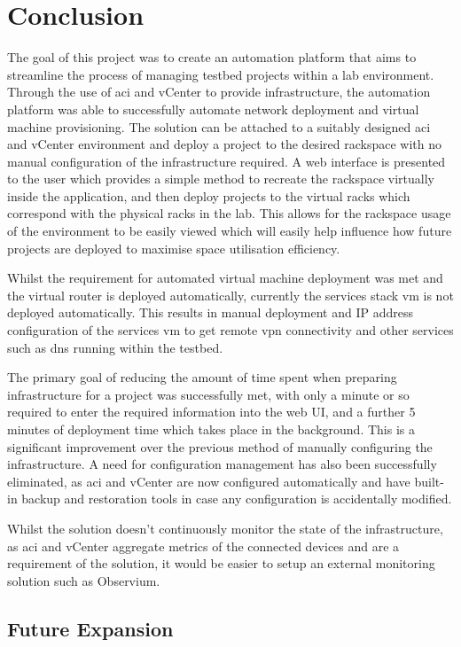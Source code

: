 \chapter{Conclusion}
\label{chap:conclusion}
The goal of this project was to create an automation platform that aims to streamline the process of managing testbed projects within a lab environment. Through the use of \gls{aci} and vCenter to provide infrastructure, the automation platform was able to successfully automate network deployment and virtual machine provisioning. The solution can be attached to a suitably designed \gls{aci} and vCenter environment and deploy a project to the desired rackspace with no manual configuration of the infrastructure required. A web interface is presented to the user which provides a simple method to recreate the rackspace virtually inside the application, and then deploy projects to the virtual racks which correspond with the physical racks in the lab. This allows for the rackspace usage of the environment to be easily viewed which will easily help influence how future projects are deployed to maximise space utilisation efficiency.

Whilst the requirement for automated virtual machine deployment was met and the virtual router is deployed automatically, currently the services stack \gls{vm} is not deployed automatically. This results in manual deployment and IP address configuration of the services \gls{vm} to get remote \gls{vpn} connectivity and other services such as \gls{dns} running within the testbed.

The primary goal of reducing the amount of time spent when preparing infrastructure for a project was successfully met, with only a minute or so required to enter the required information into the web UI, and a further 5 minutes of deployment time which takes place in the background. This is a significant improvement over the previous method of manually configuring the infrastructure. A need for configuration management has also been successfully eliminated, as \gls{aci} and vCenter are now configured automatically and have built-in backup and restoration tools in case any configuration is accidentally modified.

Whilst the solution doesn't continuously monitor the state of the infrastructure, as \gls{aci} and vCenter aggregate metrics of the connected devices and are a requirement of the solution, it would be easier to setup an external monitoring solution such as Observium.

\section{Future Expansion}
\label{sec:future-expansion}

